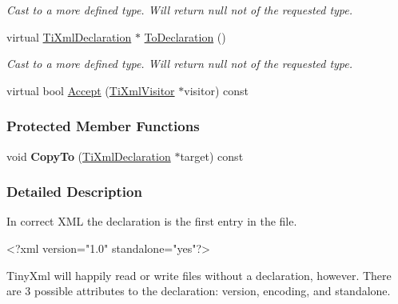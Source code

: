 \begin{DoxyCompactItemize}
\begin{DoxyCompactList}\small\item\em Cast to a more defined type. Will return null not of the requested type. \item\end{DoxyCompactList}\item 
\hypertarget{class_ti_xml_declaration_a6bd3d1daddcaeb9543c24bfd090969ce}{
virtual \hyperlink{class_ti_xml_declaration}{TiXmlDeclaration} $\ast$ \hyperlink{class_ti_xml_declaration_a6bd3d1daddcaeb9543c24bfd090969ce}{ToDeclaration} ()}
\label{class_ti_xml_declaration_a6bd3d1daddcaeb9543c24bfd090969ce}

\begin{DoxyCompactList}\small\item\em Cast to a more defined type. Will return null not of the requested type. \item\end{DoxyCompactList}\item 
virtual bool \hyperlink{class_ti_xml_declaration_ab6a6b178161ba9abc2c35058de689864}{Accept} (\hyperlink{class_ti_xml_visitor}{TiXmlVisitor} $\ast$visitor) const 
\end{DoxyCompactItemize}
\subsubsection*{Protected Member Functions}
\begin{DoxyCompactItemize}
\item 
\hypertarget{class_ti_xml_declaration_a9d08959f935421a593032bd3efb30c38}{
void {\bfseries CopyTo} (\hyperlink{class_ti_xml_declaration}{TiXmlDeclaration} $\ast$target) const }
\label{class_ti_xml_declaration_a9d08959f935421a593032bd3efb30c38}

\end{DoxyCompactItemize}


\subsubsection{Detailed Description}
In correct XML the declaration is the first entry in the file. \begin{DoxyVerb}
		<?xml version="1.0" standalone="yes"?>
	\end{DoxyVerb}


TinyXml will happily read or write files without a declaration, however. There are 3 possible attributes to the declaration: version, encoding, and standalone.


